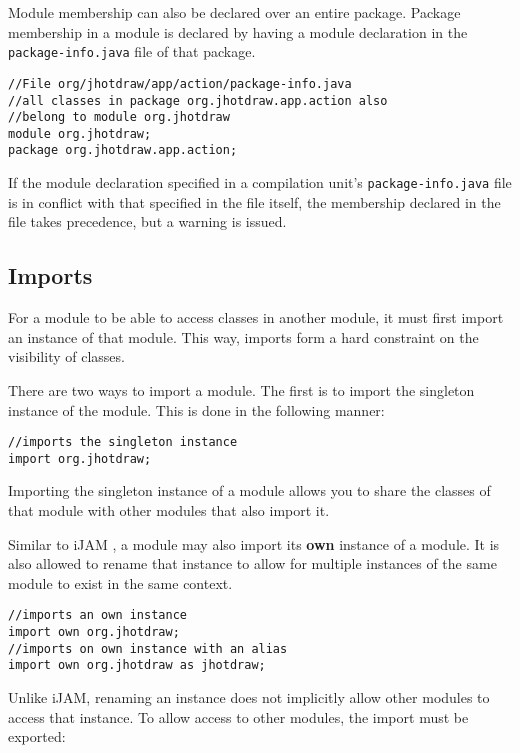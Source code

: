 Module membership can also be declared over an entire package. Package membership in a module 
is declared by having a module declaration
in the {\tt package-info.java} file of that package.

\begin{lstlisting}
//File org/jhotdraw/app/action/package-info.java
//all classes in package org.jhotdraw.app.action also
//belong to module org.jhotdraw
module org.jhotdraw;
package org.jhotdraw.app.action;
\end{lstlisting}

If the module declaration specified in a compilation unit's {\tt package-info.java}
file is in conflict with that specified in the file itself, the membership
declared in the file takes precedence, but a warning is issued.

\subsection{Imports}

For a module to be able to access classes in another module,
it must first import an instance of that module. This way, imports form
a hard constraint on the visibility of classes.

There are two ways to import a module. The first is to import the singleton
instance of the module. This is done in the following manner:

\begin{lstlisting}
//imports the singleton instance
import org.jhotdraw;
\end{lstlisting}

Importing the singleton instance of a module allows you to share the classes
of that module with other modules that also import it.

Similar to iJAM \cite{iJAM}, a module may also import its \textbf{own} instance of
a module. It is also allowed to rename that instance to allow for multiple
instances of the same module to exist in the same context.

\begin{lstlisting}
//imports an own instance
import own org.jhotdraw;
//imports on own instance with an alias
import own org.jhotdraw as jhotdraw;
\end{lstlisting}

Unlike iJAM, renaming an instance does not implicitly allow other
modules to access that instance. To allow access to other modules, the import
must be exported:

